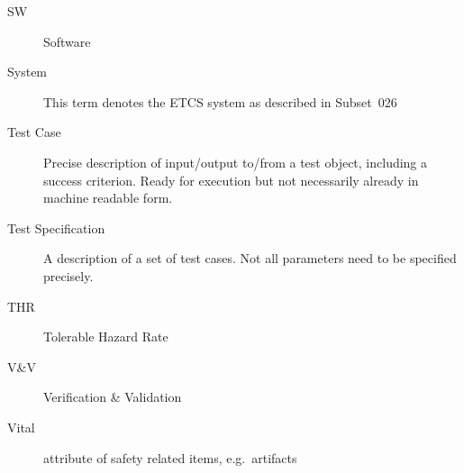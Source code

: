 \documentclass{template/openetcs_article}
\begin{document}
\begin{description}
\item[SW] Software
\item[System] This term denotes the ETCS system as described in Subset~026 \cite{subset-026:3.3.0}
\item[Test Case] Precise description of input/output to/from a test
  object, including a success criterion. Ready for execution but not
  necessarily already in machine readable form.
\item[Test Specification] A description of a set of test
  cases. Not all parameters need to be specified precisely.
\item[THR] Tolerable Hazard Rate
\item[V\&V] Verification \& Validation
\item[Vital] attribute of safety related items, e.g.\ artifacts
\end{description}










%
%






\end{document}
